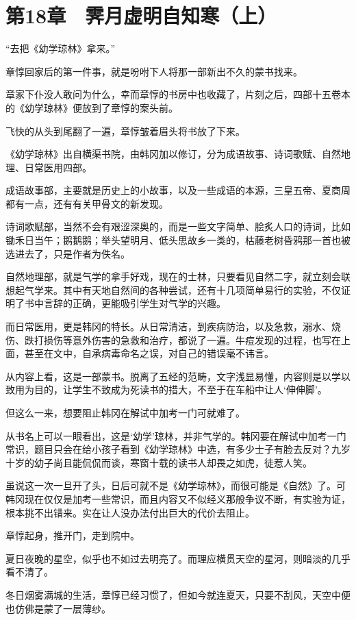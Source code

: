 \section{第18章　霁月虚明自知寒（上）}

“去把《幼学琼林》拿来。”

章惇回家后的第一件事，就是吩咐下人将那一部新出不久的蒙书找来。

章家下仆没人敢问为什么，幸而章惇的书房中也收藏了，片刻之后，四部十五卷本的《幼学琼林》便放到了章惇的案头前。

飞快的从头到尾翻了一遍，章惇皱着眉头将书放了下来。

《幼学琼林》出自横渠书院，由韩冈加以修订，分为成语故事、诗词歌赋、自然地理、日常医用四部。

成语故事部，主要就是历史上的小故事，以及一些成语的本源，三皇五帝、夏商周都有一点，还有有关甲骨文的新发现。

诗词歌赋部，当然不会有艰涩深奥的，而是一些文字简单、脍炙人口的诗词，比如锄禾日当午；鹅鹅鹅；举头望明月、低头思故乡一类的，枯藤老树昏鸦那一首也被选进去了，只是作者为佚名。

自然地理部，就是气学的拿手好戏，现在的士林，只要看见自然二字，就立刻会联想起气学来。其中有天地自然间的各种尝试，还有十几项简单易行的实验，不仅证明了书中言辞的正确，更能吸引学生对气学的兴趣。

而日常医用，更是韩冈的特长。从日常清洁，到疾病防治，以及急救，溺水、烧伤、跌打损伤等意外伤害的急救和治疗，都说了一遍。牛痘发现的过程，也写在上面，甚至在文中，自承病毒命名之误，对自己的错误毫不讳言。

从内容上看，这是一部蒙书。脱离了五经的范畴，文字浅显易懂，内容则是以学以致用为目的，让学生不致成为死读书的措大，不至于在车船中让人‘伸伸脚’。

但这么一来，想要阻止韩冈在解试中加考一门可就难了。

从书名上可以一眼看出，这是‘幼学’琼林，并非气学的。韩冈要在解试中加考一门常识，题目只会在给小孩子看到《幼学琼林》中选，有多少士子有脸去反对？九岁十岁的幼子尚且能侃侃而谈，寒窗十载的读书人却畏之如虎，徒惹人笑。

虽说这一次一旦开了头，日后可就不是《幼学琼林》，而很可能是《自然》了。可韩冈现在仅仅是加考一些常识，而且内容又不似经义那般争议不断，有实验为证，根本挑不出错来。实在让人没办法付出巨大的代价去阻止。

章惇起身，推开门，走到院中。

夏日夜晚的星空，似乎也不如过去明亮了。而理应横贯天空的星河，则暗淡的几乎看不清了。

冬日烟雾满城的生活，章惇已经习惯了，但如今就连夏天，只要不刮风，天空中便也仿佛是蒙了一层薄纱。

